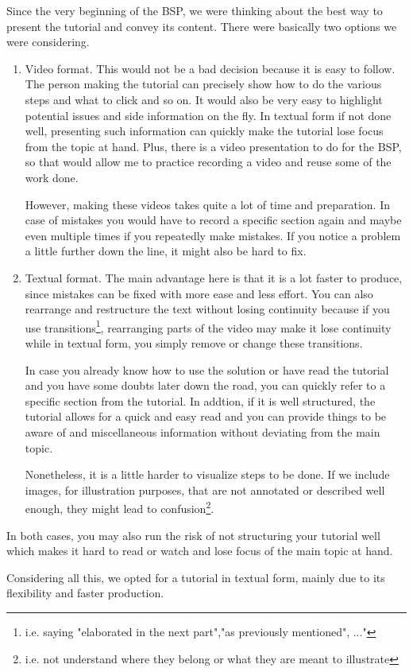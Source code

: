 
Since the very beginning of the BSP, we were thinking about the best
way to present the tutorial and convey its content. There were
basically two options we were considering. 

\begin{enumerate}
	 \item Video format. This would not be a bad decision because it
		is easy to follow. The person making the tutorial can
		precisely show how to do the various steps and what to click
		and so on. It would also be very easy to highlight potential
		issues and side information on the fly. In textual form if
		not done well, presenting such information can quickly make
		the tutorial lose focus from the topic at hand. Plus, there
		is a video presentation to do for the BSP, so that would
		allow me to practice recording a video and reuse some of the
		work done.

		However, making these videos takes quite a lot of time and
		preparation. In case of mistakes you would have to record a
		specific section again and maybe even multiple times if you
		repeatedly make mistakes. If you notice a problem a little
		further down the line, it might also be hard to fix. 

	\item Textual format. The main advantage here is that it is a lot
		faster to produce, since mistakes can be fixed with more ease
		and less effort. You can also rearrange and restructure the
		text without losing continuity because if you use
		transitions\footnote{i.e. saying "elaborated in the next
		part","as previously mentioned", ..."}, rearranging parts of
		the video may make it lose continuity while in textual form,
		you simply remove or change these transitions.

		In case you already know how to use the solution or have read
		the tutorial and you have some doubts later down the road, you
		can quickly refer to a specific section from the tutorial. In
		addtion, if it is well structured, the tutorial allows for a
		quick and easy read and you can provide things to be aware of
		and miscellaneous information without deviating from the main
		topic.

		Nonetheless, it is a little harder to visualize steps to be
		done. If we include images, for illustration purposes, that
		are not annotated or described well enough, they might lead to
		confusion\footnote{i.e. not understand where they belong or
		what they are meant to illustrate}.
\end{enumerate}
	
In both cases, you may also run the risk of not structuring your
tutorial well which makes it hard to read or watch and lose focus of
the main topic at hand.

Considering all this, we opted for a tutorial in textual form, mainly
due to its flexibility and faster production.
